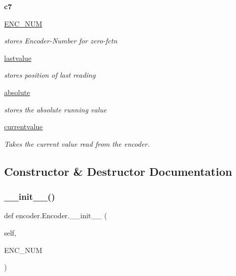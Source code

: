 \begin{DoxyCompactItemize}
{\bfseries c7}
\item 
\mbox{\label{classencoder_1_1_encoder_ace1f5ee706bd0a9e66ec2a7c1173916b}} 
\mbox{\hyperlink{classencoder_1_1_encoder_ace1f5ee706bd0a9e66ec2a7c1173916b}{E\+N\+C\+\_\+\+N\+UM}}
\begin{DoxyCompactList}\small\item\em stores Encoder-\/\+Number for zero-\/fctn \end{DoxyCompactList}\item 
\mbox{\hyperlink{classencoder_1_1_encoder_ac25b53365fa6489ddaa4417db58619de}{lastvalue}}
\begin{DoxyCompactList}\small\item\em stores position of last reading \end{DoxyCompactList}\item 
\mbox{\label{classencoder_1_1_encoder_a2138dc820e1fc83f48ab411961f2532c}} 
\mbox{\hyperlink{classencoder_1_1_encoder_a2138dc820e1fc83f48ab411961f2532c}{absolute}}
\begin{DoxyCompactList}\small\item\em stores the absolute running value \end{DoxyCompactList}\item 
\mbox{\label{classencoder_1_1_encoder_a67021e79ce3343a91b52bd4350aa8638}} 
\mbox{\hyperlink{classencoder_1_1_encoder_a67021e79ce3343a91b52bd4350aa8638}{currentvalue}}
\begin{DoxyCompactList}\small\item\em Takes the current value read from the encoder. \end{DoxyCompactList}\end{DoxyCompactItemize}


\subsection{Constructor \& Destructor Documentation}
\mbox{\label{classencoder_1_1_encoder_ae5bcae1276c8381631ead61fbb5286b4}} 
\subsubsection{\texorpdfstring{\_\_init\_\_()}{\_\_init\_\_()}}
{\footnotesize\ttfamily def encoder.\+Encoder.\+\_\+\+\_\+init\+\_\+\+\_\+ (\begin{DoxyParamCaption}\item[{}]{self,  }\item[{}]{E\+N\+C\+\_\+\+N\+UM }\end{DoxyParamCaption})}



